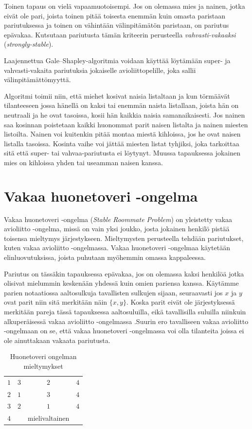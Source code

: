 \documentclass[finnish]{tktltiki2}
\theoremstyle{definition}
\theoremstyle{remark}
\begin{document}
Toinen tapaus on vielä vapaamuotoisempi. Jos on olemassa mies ja nainen, jotka eivät ole pari, joista toinen pitää toisesta enemmän kuin omasta paristaan pariutuksessa ja toinen on vähintään välinpitämätön paristaan, on pariutus epävakaa. Kutsutaan pariutusta tämän kriteerin perusteella \emph{vahvasti-vakaaksi} (\emph{strongly-stable}).

Laajennettua Gale--Shapley-algoritmia voidaan käyttää löytämään super- ja vahvasti-vakaita pariutuksia jokaiselle avioliittopelille, joka sallii välinpitämättömyyttä.

Algoritmi toimii niin, että miehet kosivat naisia listaltaan ja kun törmäävät tilanteeseen jossa hänellä on kaksi tai enemmän naista listallaan, joista hän on neutraali ja he ovat tasoissa, kosii hän kaikkia naisia samanaikaisesti. Jos nainen saa kosinnan poistetaan kaikki huonommat parit naisen listalta ja nainen miesten listoilta. Nainen voi kuitenkin pitää montaa miestä kihloissa, jos he ovat naisen listalla tasoissa. Kosinta vaihe voi jättää miesten listat tyhjiksi, joka tarkoittaa sitä että super- tai vahvaa-pariutusta ei löytynyt. Muussa tapauksessa jokainen mies on kihloissa yhden tai useamman naisen kanssa.

\section{Vakaa huonetoveri -ongelma}
Vakaa huonetoveri -ongelma (\emph{Stable Roommate Problem}) on yleistetty vakaa avioliitto -ongelma, missä on vain yksi joukko, josta jokainen henkilö pistää toisensa mieltymys järjestykseen. Mieltymysten perusteella tehdään pariutukset, kuten vakaa avioliitto -ongelmassa. Vakaa huonetoveri -ongelmaa käytetään elinluovutuksissa, joista puhutaan myöhemmin omassa kappaleessa.

Pariutus on tässäkin tapauksessa epävakaa, jos on olemassa kaksi henkilöä jotka olisivat mielummin keskenään yhdessä kuin omien pariensa kanssa. Käytämme parien notaatiossa aaltosulkuja tavallisten sulkujen sijaan, seuraavasti jos $x$ ja $y$ ovat parit niin sitä merkitään näin $\{x, y\}$. Koska parit eivät ole järjestyksessä merkitään pareja tässä tapauksessa aaltosuluilla, eikä tavallisilla suluilla niinkuin alkuperäisessä vakaa avioliitto -ongelmassa \cite[s. 163]{gusfield1989stable} .Suurin ero tavalliseen vakaa avioliitto -ongelmaan on se, että vakaa huonetoveri -ongelmassa voi olla tilanteita joissa ei ole ainuttakaan vakaata pariutusta.

\begin{table}[H]\label{room-table}
\begin{center}
	\begin{tabular}{ l | *{2}{c} r }
	 &  \\
	 \hline
 	 $1$ & $3$ & $2$ & $4$ \\
 	 $2$ & $1$ & $3$ & $4$ \\
 	 $3$ & $2$ & $1$ & $4$ \\
 	 $4$ & &mielivaltainen
	\end{tabular}
	\caption{Huonetoveri ongelman mieltymykset \cite[s. 164]{gusfield1989stable}}
\end{center}
\end{table}
\end{document}
